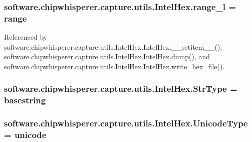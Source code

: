 \subsubsection[{range\+\_\+l}]{\setlength{\rightskip}{0pt plus 5cm}software.\+chipwhisperer.\+capture.\+utils.\+Intel\+Hex.\+range\+\_\+l = range}\label{namespacesoftware_1_1chipwhisperer_1_1capture_1_1utils_1_1IntelHex_ae461be5d25f46823cb710380e27eb1a1}


Referenced by software.\+chipwhisperer.\+capture.\+utils.\+Intel\+Hex.\+Intel\+Hex.\+\_\+\+\_\+setitem\+\_\+\+\_\+(), software.\+chipwhisperer.\+capture.\+utils.\+Intel\+Hex.\+Intel\+Hex.\+dump(), and software.\+chipwhisperer.\+capture.\+utils.\+Intel\+Hex.\+Intel\+Hex.\+write\+\_\+hex\+\_\+file().

\hypertarget{namespacesoftware_1_1chipwhisperer_1_1capture_1_1utils_1_1IntelHex_a22f9264f3c679aecae475257dd6ba7ab}{}
\subsubsection[{Str\+Type}]{\setlength{\rightskip}{0pt plus 5cm}software.\+chipwhisperer.\+capture.\+utils.\+Intel\+Hex.\+Str\+Type = basestring}\label{namespacesoftware_1_1chipwhisperer_1_1capture_1_1utils_1_1IntelHex_a22f9264f3c679aecae475257dd6ba7ab}
\hypertarget{namespacesoftware_1_1chipwhisperer_1_1capture_1_1utils_1_1IntelHex_a2c7618fbc00082e7f206aac9ae321cbd}{}
\subsubsection[{Unicode\+Type}]{\setlength{\rightskip}{0pt plus 5cm}software.\+chipwhisperer.\+capture.\+utils.\+Intel\+Hex.\+Unicode\+Type = unicode}\label{namespacesoftware_1_1chipwhisperer_1_1capture_1_1utils_1_1IntelHex_a2c7618fbc00082e7f206aac9ae321cbd}
